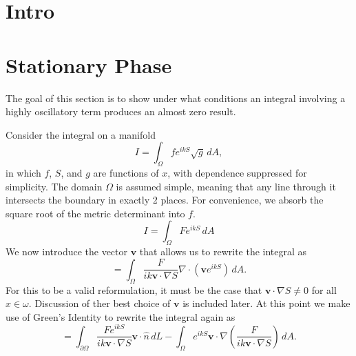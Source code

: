 \documentclass{article}
\theoremstyle{plain}
\begin{document}


\section{Intro}\label{sec_intro}



\section{Stationary Phase}\label{sec_stationaryPhase}


The goal of this section is to show under what conditions an integral involving a
highly oscillatory term produces an almost zero result.

Consider the integral on a manifold
\begin{equation}
    I = \int_\Omega f e^{ikS} \sqrt{g} \,dA,
\end{equation}
in which $f$, $S$, and $g$ are functions of $x$, with dependence suppressed for simplicity.
The domain $\Omega$ is assumed simple, meaning that any line through it intersects the boundary in exactly 2 places.
For convenience, we absorb the square root of the metric determinant into $f$.
\begin{equation}
    I = \int_\Omega F e^{ikS} \,dA
\end{equation}
We now introduce the vector $\mathbf{v}$ that allows us to rewrite the integral as
\begin{equation}
    = \int_\Omega \frac{F}{ik\mathbf{v}\cdot\nabla S} \nabla\cdot\left( \mathbf{v}e^{ikS} \right) \,dA.
\end{equation}
For this to be a valid reformulation, it must be the case that $\mathbf{v}\cdot\nabla S \neq 0$ for all $x\in\omega$.
Discussion of ther best choice of $\mathbf{v}$ is included later.
At this point we make use of Green's Identity to rewrite the integral again as
\begin{equation}
    = \int_{\partial\Omega} \frac{Fe^{ikS}}{ik\mathbf{v}\cdot\nabla S} \mathbf{v}\cdot\hat{n} \,dL
    - \int_\Omega e^{ikS} \mathbf{v}\cdot\nabla\left( \frac{F}{ik\mathbf{v}\cdot\nabla S} \right) \,dA.
\end{equation}
\end{document}
